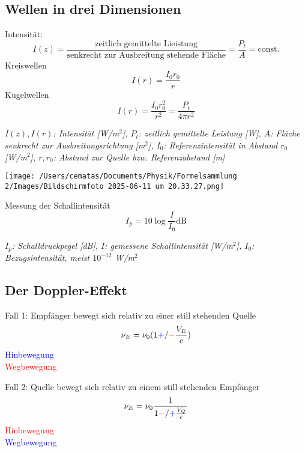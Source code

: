 \documentclass[a4paper,10pt]{article}
\newenvironment{displayformula}
{
	\begin{framed}
		\color{formulaColor}
	}
	{\end{framed}}
\newcommand{\formulalegend}[1]{%
	\par\vspace{0.5ex}%
	{{\color{legendColor}\RaggedRight\small\textit{#1}}}%
	\par\vspace{1.5ex}%
}
\begin{document}
\newpage

\subsection{Wellen in drei Dimensionen}
\begin{displayformula}
	Intensität:
	\[
	I(z) = \frac{\text{zeitlich gemittelte Lieistung}}{\text{senkrecht zur Ausbreitung stehende Fläche}} = \frac{P_t}{A} = \text{const.}
	\]
	Kreiswellen
	\[
	I(r) = \frac{I_0r_0}{r}
	\]
	Kugelwellen
	\[
	I(r) = \frac{I_0r_0^2}{r^2} = \frac{P_t}{4\pi r^2}
	\]
\end{displayformula}
\formulalegend{
	\( I(z), I(r) \): Intensität [W/m\(^2\)], 
	\( P_t \): zeitlich gemittelte Leistung [W], 
	\( A \): Fläche senkrecht zur Ausbreitungsrichtung [m\(^2\)], 
	\( I_0 \): Referenzintensität in Abstand \( r_0 \) [W/m\(^2\)], 
	\( r, r_0 \): Abstand zur Quelle bzw. Referenzabstand [m]
}
\texttt{[image: /Users/cematas/Documents/Physik/Formelsammlung 2/Images/Bildschirmfoto 2025-06-11 um 20.33.27.png]}

\begin{displayformula}
	Messung der Schallintensität
	\[
	I_p = 10\log \frac{I}{I_0} \text{dB}
	\]
\end{displayformula}
\formulalegend{
	$I_p$: Schalldruckpegel [dB], 
	$I$: gemessene Schallintensität [W/m$^2$], 
	$I_0$: Bezugsintensität, meist $10^{-12}$ W/m$^2$
}



\subsection{Der Doppler-Effekt}



\begin{displayformula}
	Fall 1: Empfänger bewegt sich relativ zu einer still stehenden Quelle
	\[
	\nu_E = \nu_0 (1 \textcolor{blue}{+} / \textcolor{red}{-} \frac{V_E}{c})
	\]
	\textcolor{blue}{Hinbewegung} \\
	\textcolor{red}{Wegbewegung}
\end{displayformula}


\begin{displayformula}
	Fall 2: Quelle bewegt sich relativ zu einem still stehenden Empfänger
	\[
	\nu_E = \nu_0 \frac{1}{1 \textcolor{red}{-} / \textcolor{blue}{+} \frac{V_Q}{c}}
	\]
	\textcolor{red}{Hinbewegung} \\
	\textcolor{blue}{Wegbewegung}
\end{displayformula}
\end{document}
